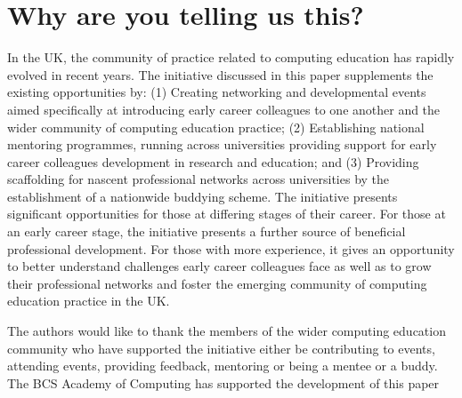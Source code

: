 \documentclass[sigconf]{acmart}
\begin{document}
\section{Why are you telling us this?}
 In the UK, the community of practice related to computing education has rapidly evolved in recent years. The initiative discussed in this paper supplements the existing opportunities by: (1) Creating networking and developmental events aimed specifically at introducing early career colleagues to one another and the wider community of computing education practice; (2) Establishing national mentoring programmes, running across universities providing support for early career colleagues development in research and education; and (3) Providing scaffolding for nascent professional networks across universities by the establishment of a nationwide buddying scheme. The initiative presents significant opportunities for those at differing stages of their career.  For those at an early career stage, the initiative presents a further source of beneficial professional development. For those with more experience, it gives an opportunity to better understand challenges early career colleagues face as well as to grow their professional networks and foster the emerging community of computing education practice in the UK. 

\begin{acks}
	
	The authors would like to thank the members of the wider computing education community who have supported the initiative either be contributing to events, attending events, providing feedback, mentoring or being a mentee or a buddy.
	The BCS Academy of Computing has supported the development of this paper
	
	
\end{acks}




\end{document}
